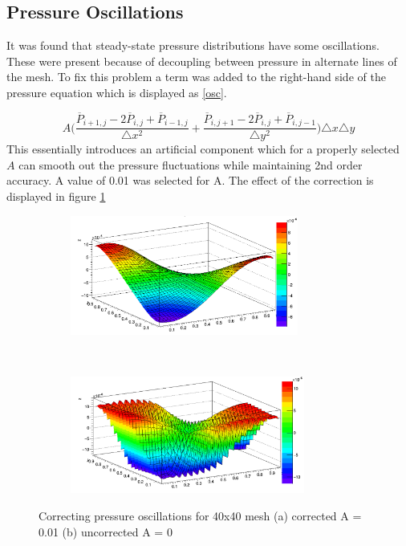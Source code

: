 \documentclass[paper=a4, fontsize=11pt, abstract=on]{scrartcl}
\numberwithin{equation}{section}		%
\numberwithin{figure}{section}			%
\numberwithin{table}{section}				%
\begin{document}
\subsection{Pressure Oscillations}
It was found that steady-state pressure distributions have
some oscillations. These were present because of decoupling between pressure in alternate lines of the mesh. To fix this problem a term was added to the
right-hand side of the pressure equation which is displayed as \ref{osc}. 

 \begin{equation}
\label{osc}
A\Bigg(\frac{\overline{P}_{i+1,j}-2\overline{P}_{i,j}+\overline{P}_{i-1,j} }{\triangle x^2} +\frac{\overline{P}_{i,j+1}-2\overline{P}_{i,j}+\overline{P}_{i,j-1} }{\triangle y^2}\Bigg)\triangle x \triangle y
\end{equation} 
This essentially introduces an artificial component which for a properly selected $A$ can smooth out the pressure fluctuations while maintaining 2nd order accuracy.
A value of 0.01 was selected for A. The effect of the correction is displayed in figure \ref{osc2} 

\begin{figure}[H]
        \centering
        \begin{subfigure}[h]{0.5\textwidth}
                \includegraphics[width = 7.5cm]{o1}
                \caption{}
				
        \end{subfigure}%
       ~~~~~
        \begin{subfigure}[h]{0.5\textwidth}
                \includegraphics[width = 7.7cm]{o2}
                \caption{}
                
        \end{subfigure}
        \caption{Correcting pressure oscillations for 40x40 mesh (a) corrected A = 0.01 (b) uncorrected A = 0  }
        \label{osc2}
\end{figure}
\end{document}
